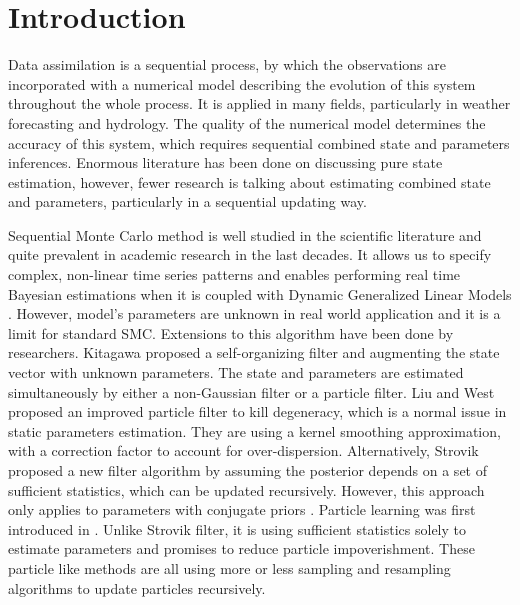 
\section{Introduction}

Data assimilation is a sequential process, by which the observations are incorporated with a numerical model describing the evolution of this system throughout the whole process. It is applied in many fields, particularly in weather forecasting and hydrology. The quality of the numerical model determines the accuracy of this system, which requires sequential combined state and parameters inferences. Enormous literature has been done on discussing pure state estimation, however, fewer research is talking about estimating combined state and parameters, particularly in a sequential updating way. 

Sequential Monte Carlo method is well studied in the scientific literature and quite prevalent in academic research in the last decades. It allows us to specify complex, non-linear time series patterns and enables performing real time Bayesian estimations when it is coupled with Dynamic Generalized Linear Models \cite{vieira2016online}. However, model's parameters are unknown in real world application and it is a limit for standard SMC. Extensions to this algorithm have been done by researchers. Kitagawa \cite{kitagawa1998self} proposed a self-organizing filter and augmenting the state vector with unknown parameters. The state and parameters are estimated simultaneously by either a non-Gaussian filter or a particle filter. Liu and West \cite{liu2001combined} proposed an improved particle filter to kill degeneracy, which is a normal issue in static parameters estimation. They are using a kernel smoothing approximation, with a correction factor to account for over-dispersion. Alternatively, Strovik \cite{storvik2002particle} proposed a new filter algorithm by assuming the posterior depends on a set of sufficient statistics, which can be updated recursively. However, this approach only applies to parameters with conjugate priors \cite{stroud2016bayesian}. Particle learning was first introduced in \cite{carvalho2010particle}. Unlike Strovik filter, it is using sufficient statistics solely to estimate parameters and promises to reduce particle impoverishment. These particle like methods are all using more or less sampling and resampling algorithms to update particles recursively. 

